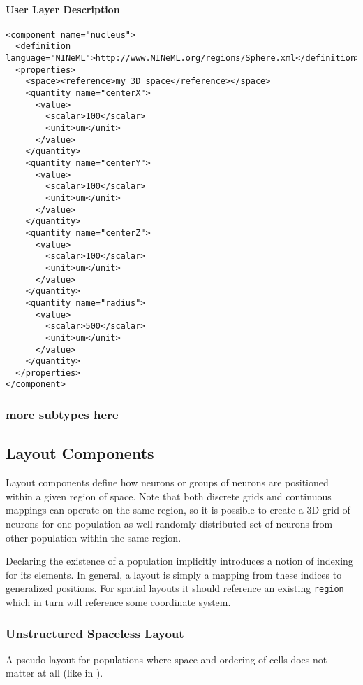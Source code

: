 \documentclass{article}
\begin{document}
\paragraph{User Layer Description}
\begin{verbatim}
<component name="nucleus">
  <definition language="NINeML">http://www.NINeML.org/regions/Sphere.xml</definition>
  <properties>
    <space><reference>my 3D space</reference></space>
    <quantity name="centerX">
      <value>
        <scalar>100</scalar>
        <unit>um</unit>
      </value>
    </quantity>
    <quantity name="centerY">
      <value>
        <scalar>100</scalar>
        <unit>um</unit>
      </value>
    </quantity>
    <quantity name="centerZ">
      <value>
        <scalar>100</scalar>
        <unit>um</unit>
      </value>
    </quantity>
    <quantity name="radius">
      <value>
        <scalar>500</scalar>
        <unit>um</unit>
      </value>
    </quantity>
  </properties>
</component>
\end{verbatim}

\subsubsection{more subtypes here}

\subsection{Layout Components}
\label{layout}

Layout components define how neurons or groups of neurons are positioned within
a given region of space. Note that both discrete grids and continuous
mappings can operate on the same region, so it is possible to create a 3D
grid of neurons for one population as well randomly distributed set of
neurons from other population within the same region.

Declaring the existence of a population implicitly introduces a notion of
indexing for its elements. In general, a layout is simply a mapping from these
indices to generalized positions. For spatial layouts it should reference an
existing {\tt region} which in turn will reference some coordinate system.

\subsubsection{Unstructured Spaceless Layout}

A pseudo-layout for populations where space and ordering of cells does not matter
at all (like in \cite{brunel-00}).
\end{document}
